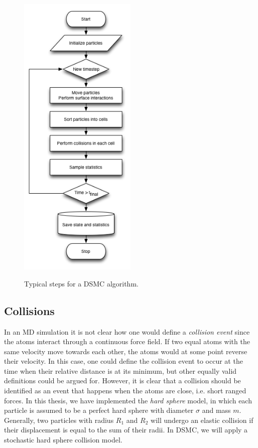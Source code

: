 \begin{figure}[h]
\begin{center}
\includegraphics[width=0.5\textwidth, trim=0cm 0cm 0cm 0cm, clip]{DSMC/figures/dsmc_flowchart.png}
\label{fig:dsmc_flowchart}
\end{center}
\caption{Typical steps for a DSMC algorithm.}
\end{figure}

\subsection{Collisions}
In an MD simulation it is not clear how one would define a \textit{collision event} since the atoms interact through a continuous force field. If two equal atoms with the same velocity move towards each other, the atoms would at some point reverse their velocity. In this case, one could define the collision event to occur at the time when their relative distance is at its minimum, but other equally valid definitions could be argued for. However, it is clear that a collision should be identified as an event that happens when the atoms are close, i.e. short ranged forces. In this thesis, we have implemented the \textit{hard sphere} model, in which each particle is assumed to be a perfect hard sphere with diameter $\sigma$ and mass $m$. Generally, two particles with radius $R_1$ and $R_2$ will undergo an elastic collision if their displacement is equal to the sum of their radii. In DSMC, we will apply a stochastic hard sphere collision model.\\
